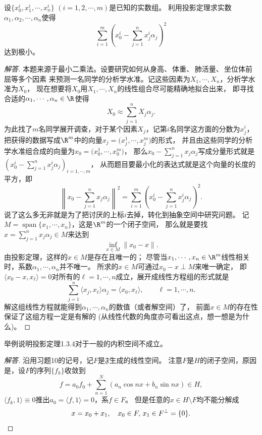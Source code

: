 \begin{12}
    设$\big\{x_0^i,x_1^i,\cdots,x_n^i\big\}$ $(i=1,2,\cdots,m)$是已知的实数组。
    利用投影定理求实数$\alpha_1,\alpha_2,\cdots,\alpha_n$使得
    \[\sum_{i=1}^m\left(x_0^i-\sum_{j=1}^nx_j^i\alpha_j\right)^2\]
    达到极小。
\end{12}
\begin{proof}[解答]
    本题来源于最小二乘法。设要研究如何从身高、\,体重、\,肺活量、\,坐位体前屈等多个因素
    来预测一名同学的分析学水准。记这些因素为$X_1,\cdots,X_n$，分析学水准为$X_0$，
    现在想要将$X_0$用$X_1,\cdots,X_n$的线性组合尽可能精确地拟合出来，
    即寻找合适的$\alpha_1,\cdots,\alpha_n\in\R$使得
    \[X_0\approx\sum_{j=1}^nX_j\alpha_j.\]
    为此找了$m$名同学展开调查，对于某个因素$X_j$，记第$i$名同学这方面的分数为$x_j^i$，
    把获得的数据写成$\R^m$中的向量$x_j=\big(x_j^1,\cdots,x_j^m\big)$的形式，
    并且由这些同学的分析学水准组合成的向量为$x_0=\big(x_0^1,\cdots,x_0^m\big)$，
    那么$x_0-\sum\limits_{j=1}^nx_j\alpha_j$写成分量形式就是
    $\left(x_0^i-\sum\limits_{j=1}^nx_j^i\alpha_j\right)_{i=1,\cdots,m}$，
    从而题目要最小化的表达式就是这个向量的长度的平方，即
    \[\left\|x_0-\sum_{j=1}^nx_j\alpha_j\right\|^2
    =\sum_{i=1}^m\left(x_0^i-\sum_{j=1}^nx_j^i\alpha_j\right)^2.\]
    说了这么多无非就是为了把讨厌的上标$i$去掉，转化到抽象空间中研究问题。
    记$M=\operatorname{span}\{x_1,\cdots,x_n\}$，这是$\R^m$的一个闭子空间，
    那么就是要找$x=\sum\limits_{j=1}^nx_j\alpha_j \in M$来达到
    \[\inf_{x \in M}\|x_0-x\|.\]
    由投影定理，这样的$x \in M$是存在且唯一的；
    尽管当$x_1,\cdots,x_n\in\R^m$线性相关时，系数$\alpha_1,\cdots,\alpha_n$并不唯一。
    所求的$x \in M$可通过$x_0-x \perp M$来唯一确定，
    即$\langle x_0-x,x_\ell \rangle=0$对所有的$\ell=1,\cdots,n$成立，展开成线性方程组的形式就是
    \[\sum_{j=1}^n\langle x_j,x_\ell \rangle\alpha_j=\langle x_0,x_\ell \rangle,\qquad\ell=1,\cdots,n.\]
    解这组线性方程就能得到$\alpha_1,\cdots,\alpha_n$的数值（或者解空间）了，
    前面$x \in M$的存在性保证了这组方程一定是有解的 (从线性代数的角度亦可看出这点，想一想是为什么)。
\end{proof}
\begin{13}
    举例说明投影定理1.3.4对于一般的内积空间不成立。
\end{13}
\begin{proof}[解答]
    沿用习题10的记号，记$F$是$\mathfrak{F}$生成的线性空间。
    注意$F$是$H$的闭子空间，原因是，设$F$的序列$\{f_k\}$收敛到
    \[f=a_0f_0+\sum_{n=1}^N(a_n\cos nx+b_n\sin nx)\in H,\]
    $\langle f_k,1 \rangle \equiv 0$推出$a_0=\langle f,1 \rangle=0$，系$f\in F$。
    但是任意的$x\in H \setminus F$均不能分解成
    $$x=x_0+x_1,\quad x_0\in F,\,x_1\in F^\perp=\{0\}.\qedhere$$
\end{proof}


